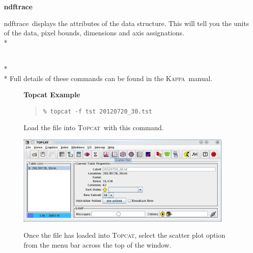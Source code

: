 \documentclass[twoside,11pt]{article}
\newenvironment{fmpage}[1]
{\begin{lrbox}{\fmbox}\begin{minipage}{#1}}
{\end{minipage}\end{lrbox}\fbox{\usebox{\fmbox}}}
\newcounter{box}
\newcommand{\htmladdnormallink}[2]{#1}
\newcommand{\xref}[3]{#1}
\renewcommand{\_}{\texttt{\symbol{95}}}
\newenvironment{myquote}{\begin{quote}\begin{small}}{\end{small}\end{quote}}
\newcommand{\Kappa}{\xref{\textsc{Kappa}}{sun95}{}}
\newcommand{\topcat}{\htmladdnormallink{\textsc{Topcat}}{http://www.starlink.ac.uk/topcat}}
\newcommand{\task}[1]{\textsf{#1}}
\newcommand{\ndftrace}{\xref{\task{ndftrace}}{sun95}{NDFTRACE}}
\begin{document}
\begin{minipage}[t]{0.12\linewidth}
\textbf{ndftrace}
\end{minipage}
\begin{minipage}[t]{0.85\linewidth}
\ndftrace\ displays the attributes of the data structure. This will tell you the units of the data, pixel bounds, dimensions and axis assignations.\\*
\end{minipage}
\\*\\*
Full details of these commands can be found in the \Kappa\ manual.


\begin{figure}[ht!]
\begin{center}
\begin{fmpage}{0.95\linewidth}
\vspace{0.2cm}
\textbf{ Topcat Example}

\vspace{0.5cm}

\begin{minipage}[c]{0.6\linewidth}

\begin{myquote}
\begin{verbatim}
% topcat -f tst 20120720_30.tst
\end{verbatim}
\end{myquote}
\end{minipage}
\hspace{0.3cm}
\begin{minipage}[c]{0.32\linewidth}
Load the file into \topcat\ with this command.
\end{minipage}

\vspace{0.5cm}

\begin{minipage}[c]{0.6\linewidth}
\centering
\includegraphics[width=0.95\textwidth]{topcat1.eps}

\end{minipage}
\hspace{0.3cm}
\begin{minipage}[c]{0.32\linewidth}
Once the file has loaded into \topcat, select the scatter plot option from the menu bar across the top of the window. 
\end{minipage}


\end{fmpage}
\end{center}
\end{figure}
\end{document}
